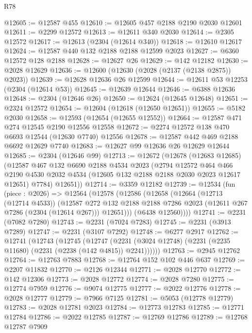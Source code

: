 \begin{lexlean}{R78}
\begin{coremodule}
@12605 := @12587 @455
@12610 := @12605 @457 @2188 @2190 @2030 @12601
@12611 := @2299 @12572
@12613 := @12611 @340 @2030
@12614 := @2305 @12572
@12617 := @12613 (@2304 (@12614 @340))
@12618 := @12610 @12617
@12624 := @12587 @440 @132 @2188 @2188 @12599 @2023
@12627 := @6360 @12572 @128 @2188
@12628 := @12627 @26
@12629 := @142 @12182
@12630 := @2028 @12629
@12636 := @12600 (@12630 (@2028 (@2137 (@2138 @2875)) @2023))
@12639 := @12628 @12636 @26 @12599
@12644 := @12611 @53 @12253 (@2304 (@12614 @53))
@12645 := @12639 @12644
@12646 := @6388 @12636
@12648 := @2304 (@12646 @26)
@12650 := @12624 (@12645 @12648)
@12651 := @2324 @12572
@12654 := @12604 (@12618 (@12650 @12651))
@12655 := @5182 @2030
@12658 := @12593 (@12654 (@12655 @12552))
@12664 := @12587 @471 @274 @12545 @2190 @12556 @12558
@12672 := @2274 @12572 @138 @470 @6693 @12544 (@12630 @7740) @12556
@12678 := @12587 @442 @469 @2188 @6692 @12629 @7740
@12683 := @12627 @99 @12636 @26 @12629 @12644
@12685 := @2304 (@12646 @99)
@12713 := @12672
    (@12678
      (@12683 @12685)
      (@12587
        @467
        @132
        @6690
        @2188
        @4534
        @2023
        (@2794
          @12572
          @464
          @466
          @2190
          @4530
          @2032
          @4534
          (@12605 @132 @2188 @2188 @2030 @2023 @12617 @12651)
          @7784)
        @12651))
@12714 := @3359 @12182
@12739 := @12534
    (fun (piece : @2026) =>
    @12564
      (@12578
        (@12586
          (@12658
            (@12664
              (@12713 (@12714 @4533))
              (@12587
                @272
                @132
                @2188
                @2188
                @7286
                @2023
                (@12611 @267 @7286 (@2304 (@12614 @267)))
                @12651)))
          (@6438 @12560))))
@12741 := @2231 (@7082 @7280)
@12743 := @2231 (@7024 @7283)
@12745 := @2231 (@3913 @7289)
@12747 := @2231 (@3107 @7292)
@12748 := @6277 @2917
@12762 := @12741
    (@12743
      (@12745
        (@12747 (@2231 (@3024 @12748) (@2231 (@2235 @11680) (@2231 (@2238 (@142 @4815)) @2241))))))
@12763 := @2945 @12762
@12764 := @12763 @7883
@12768 := @12764 @152 @102 @446 @637
@12769 := @2207 @11832
@12770 := @2126 @12344
@12771 := @2028 @12770
@12772 := @142 @12306
@12773 := @2028 @12772
@12774 := @2028 @7280
@12775 := @12774 @7959
@12776 := @9074 @12775
@12777 := @2022 @12776
@12778 := @2028 @12777
@12779 := @7966 @7125
@12781 := @5053 (@12778 @12779)
@12783 := @2028 @12781 @2023
@12784 := @12773 @12783
@12785 := @12771 @12784
@12786 := @2022 @12785
@12787 := @12769 @12786
@12789 := @12768 @12787 @7909

\end{coremodule}
\end{lexlean}
